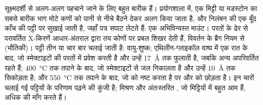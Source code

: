 \begin{inthelab}[X-किरण विवर्तन से मृत्तिका-खनिजों की पहचान]
 सूक्ष्मदर्शी से अलग-अलग पहचाने जाने के लिए बहुत बारीक हैं। प्रयोगशाला में, एक मिट्टी या मडस्टोन का सबसे बारीक भाग मोटे कणों को पानी से नीचे बैठने देकर अलग किया जाता है, और निलंबन की एक बूँद काँच की पट्टी पर सुखाई जाती है, जहाँ पत्र सपाट लेटते हैं: एक अभिविन्यस्त माउंट। परतों के ढेर से परावर्तित X-किरणें आधार-अंतराल द्वारा तय कोणों पर प्रबल शिखर देती हैं, विवर्तन के ब्रैग नियम से (भौतिकी)। पट्टी तीन या चार बार चलाई जाती है: वायु-शुष्क; एथिलीन-ग्लाइकॉल वाष्प में एक रात के बाद, जो स्मेक्टाइटों की परतों में प्रवेश करती है और उन्हें \SI{17}{\angstrom} तक फुलाती है, जबकि अन्य  अपरिवर्तित रहते हैं; \SI{400}{\celsius} तक तपाने के बाद, जो स्मेक्टाइटों से जल निकालता है और उन्हें \SI{10}{\angstrom} तक सिकोड़ता है; और \SI{550}{\celsius} तक तपाने के बाद, जो  को नष्ट करता है पर  और  को छोड़ता है।  इन चारों चलाई गई पट्टियों के परिणाम पढ़ने की कुंजी है; मिश्रण और अंतःस्तरित , जो मिट्टियों में बहुत आम हैं, अधिक की माँग करते हैं।
\end{inthelab}

